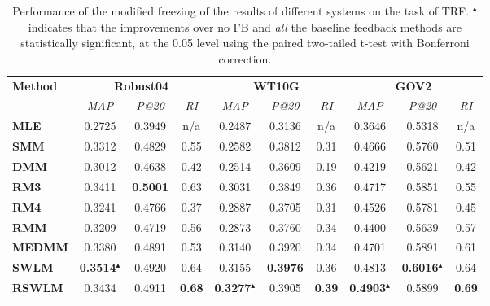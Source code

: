 \begin{table}[tbp]
\centering
\caption{\label{tbl_rf}Performance of the modified freezing of the results of different systems on the task of TRF. $^\blacktriangleup$ indicates that the improvements over no FB and \emph{all} the baseline feedback methods are statistically significant, at the 0.05 level using the paired two-tailed t-test with Bonferroni correction.}
\begin{adjustbox}{max width=\columnwidth}
\begin{tabular}{lccccccccc}
\toprule
\multirow{2}{*}{\textbf{Method}} &
\multicolumn{3}{c}{\textbf{Robust04}} & \multicolumn{3}{c}{\textbf{WT10G}} & \multicolumn{3}{c}{\textbf{GOV2}} 
\\ \cmidrule(lr){2-4} \cmidrule(lr){5-7} \cmidrule(lr){8-10}
& \textit{MAP} & \textit{P@20} & \textit{RI} & \textit{MAP} & \textit{P@20} &  \textit{RI} &  \textit{MAP} & \textit{P@20}   & \textit{RI} 
\\ \midrule
\textbf{MLE} & 0.2725 & 0.3949 & n/a & 0.2487 & 0.3136 & n/a & 0.3646 & 0.5318 & n/a
\\ 
\textbf{SMM} & 0.3312 & 0.4829 & 0.55 & 0.2582 & 0.3812 & 0.31 & 0.4666 & 0.5760 & 0.51 
\\ 
\textbf{DMM} & 0.3012 & 0.4638 & 0.42 & 0.2514 & 0.3609 & 0.19 & 0.4219 & 0.5621 & 0.42
\\ 
\textbf{RM3} & 0.3411 & \textbf{0.5001} & 0.63 & 0.3031 & 0.3849 & 0.36 & 0.4717 & 0.5851 & 0.55
\\ 
\textbf{RM4} & 0.3241 & 0.4766 & 0.37 & 0.2887 & 0.3705 & 0.31 & 0.4526 & 0.5781 & 0.45
\\ 
\textbf{RMM} & 0.3209 & 0.4719 & 0.56 & 0.2873 & 0.3760 & 0.34  & 0.4400 & 0.5639 & 0.57
\\ 
\textbf{MEDMM} & 0.3380 & 0.4891 & 0.53 & 0.3140 & 0.3920 & 0.34 & 0.4701 & 0.5891 & 0.61 \\ 
\textbf{SWLM} & \textbf{0.3514}$^\blacktriangleup$ &  0.4920 & 0.64 & 0.3155 & \textbf{0.3976} & 0.36 & 0.4813 & \textbf{0.6016}$^\blacktriangleup$ & 0.64 
\\ 
\textbf{RSWLM} & 0.3434 & 0.4911 & \textbf{0.68} & \textbf{0.3277}$^\blacktriangleup$ & 0.3905 & \textbf{0.39} & \textbf{0.4903}$^\blacktriangleup$ & 0.5899 & \textbf{0.69}
\\ \bottomrule
\end{tabular}
\end{adjustbox}
\end{table}



